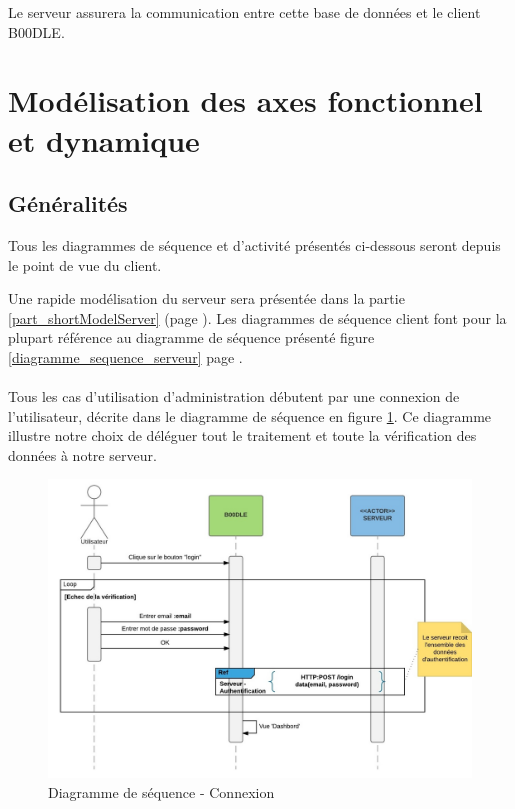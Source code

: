 \documentclass[titlepage]{report}
\begin{document}
\par Le serveur assurera la communication entre cette base de données et le client B00DLE.

\clearpage

\section{Modélisation des axes fonctionnel et dynamique}

\subsection{Généralités}

\par Tous les diagrammes de séquence et d'activité présentés ci-dessous seront depuis le point de vue du client.
\par Une rapide modélisation du serveur sera présentée dans la partie \ref{part_shortModelServer} (page \pageref{shortModelServer}). Les diagrammes de séquence client font pour la plupart référence au diagramme de séquence présenté figure \ref{diagramme_sequence_serveur} page \pageref{diagramme_sequence_serveur}.

\paragraph{} Tous les cas d'utilisation d'administration débutent par une connexion de l'utilisateur, décrite dans le diagramme de séquence en figure \ref{diagramme_sequence_connexion}. Ce diagramme illustre notre choix de déléguer tout le traitement et toute la vérification des données à notre serveur.

\begin{figure}[h]
	\caption{Diagramme de séquence - Connexion}
	\label{diagramme_sequence_connexion}
	\centering
	\includegraphics[width=\textwidth]{figures/diagrammes/sequence_connexion.png}
\end{figure}
\end{document}
